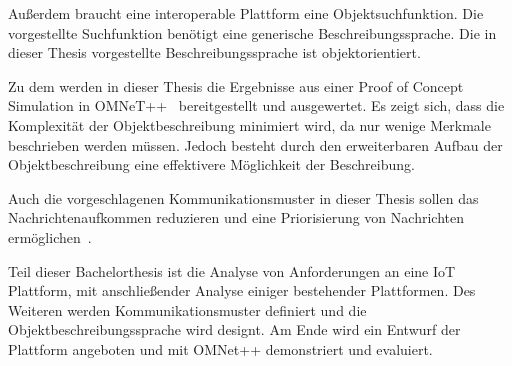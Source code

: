Außerdem braucht eine interoperable Plattform eine Objektsuchfunktion. 
Die vorgestellte Suchfunktion benötigt eine generische Beschreibungssprache. 
Die in dieser Thesis vorgestellte Beschreibungssprache ist objektorientiert.
 
Zu dem werden in dieser Thesis die Ergebnisse aus einer Proof of Concept Simulation in OMNeT++~\cite{omnetpp_simulation_manual} bereitgestellt und ausgewertet. 
Es zeigt sich, dass die Komplexität der Objektbeschreibung minimiert wird, da nur wenige Merkmale beschrieben werden müssen. 
Jedoch besteht durch den erweiterbaren Aufbau der Objektbeschreibung eine effektivere Möglichkeit der Beschreibung.

Auch die vorgeschlagenen Kommunikationsmuster in dieser Thesis sollen das Nachrichtenaufkommen reduzieren und eine Priorisierung von Nachrichten ermöglichen~\cite{rise}.\newline

\noindent Teil dieser Bachelorthesis ist die Analyse von Anforderungen an eine IoT Plattform, mit anschließender Analyse einiger bestehender Plattformen.
Des Weiteren werden Kommunikationsmuster definiert und die Objektbeschreibungssprache wird designt.
Am Ende wird ein Entwurf der Plattform angeboten und mit OMNet++ demonstriert und evaluiert.\newline


